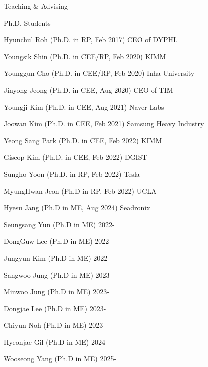 \begin{rSection}{Teaching \& Advising}
\begin{rSubsection}{Ph.D. Students}{}{}{}
  \item Hyunchul Roh (Ph.D. in \ac{RP}, Feb 2017) \hfill CEO of DYPHI.
  \item Youngsik Shin (Ph.D. in \ac{CEE}/\ac{RP}, Feb 2020) \hfill KIMM
  \item Younggun Cho (Ph.D. in \ac{CEE}/\ac{RP}, Feb 2020) \hfill Inha University
  \item Jinyong Jeong (Ph.D. in \ac{CEE}, Aug 2020) \hfill CEO of TIM
  \item Youngji Kim (Ph.D. in \ac{CEE}, Aug 2021) \hfill Naver Labs
  \item Joowan Kim (Ph.D. in \ac{CEE}, Feb 2021) \hfill Samsung Heavy Industry
  \item Yeong Sang Park (Ph.D. in \ac{CEE}, Feb 2022) \hfill KIMM
  \item Giseop Kim (Ph.D. in \ac{CEE}, Feb 2022) \hfill DGIST
  \item Sungho Yoon (Ph.D. in \ac{RP}, Feb 2022) \hfill Tesla
  \item MyungHwan Jeon (Ph.D in \ac{RP}, Feb 2022) \hfill UCLA
  \item Hyesu Jang (Ph.D in \ac{ME}, Aug 2024) \hfill Seadronix
  \item Seungsang Yun (Ph.D in \ac{ME}) \hfill 2022-
  \item DongGuw Lee (Ph.D in \ac{ME}) \hfill 2022-
  \item Jungyun Kim (Ph.D in \ac{ME}) \hfill 2022-
  \item Sangwoo Jung (Ph.D in \ac{ME}) \hfill 2023-
  \item Minwoo Jung (Ph.D in \ac{ME}) \hfill 2023-
  \item Dongjae Lee (Ph.D in \ac{ME}) \hfill 2023-
  \item Chiyun Noh (Ph.D in \ac{ME}) \hfill 2023-
  \item Hyeonjae Gil (Ph.D in \ac{ME}) \hfill 2024-
  \item Wooseong Yang (Ph.D in \ac{ME}) \hfill 2025-
\end{rSubsection}


\end{rSection}
